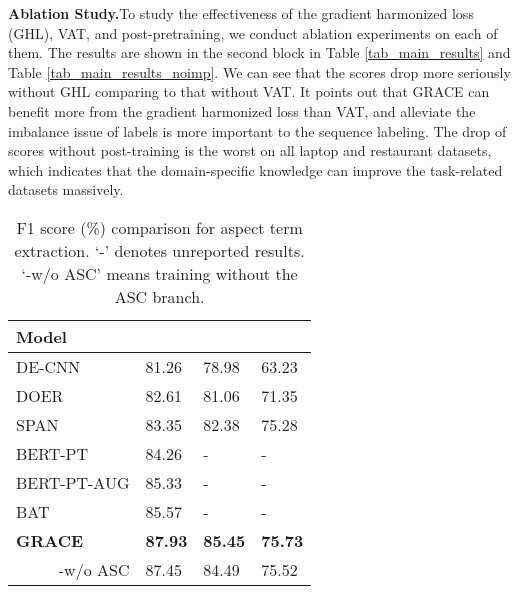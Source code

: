 \documentclass[11pt,a4paper]{article}
\begin{document}
\vspace{+1mm}
\noindent
\textbf{Ablation Study.}\quad To study the effectiveness of the gradient harmonized loss (GHL), VAT, and post-pretraining, we conduct ablation experiments on each of them. The results are shown in the second block in Table \ref{tab_main_results} and Table \ref{tab_main_results_noimp}. We can see that the scores drop more seriously without GHL comparing to that without VAT. It points out that GRACE can benefit more from the gradient harmonized loss than VAT, and alleviate the imbalance issue of labels is more important to the sequence labeling. The drop of scores without post-training is the worst on all laptop and restaurant datasets, which indicates that the domain-specific knowledge can improve the task-related datasets massively.
\begin{table}[tp]
    \begin{center}
        \begin{tabular}{|l|p{1.1cm}<{\centering}|p{1.1cm}<{\centering}|p{1.1cm}<{\centering}|}
            \hline
            Model     &  &  &  \\ \hline \hline
            DE-CNN             & 81.26 & 78.98 & 63.23  \\ 
            DOER               & 82.61 & 81.06 & 71.35 \\ 
            SPAN     & 83.35 & 82.38 & 75.28 \\ 
            BERT-PT            & 84.26 & - & - \\ 
            BERT-PT-AUG        & 85.33 & - & - \\ 
            BAT                & 85.57 & - & - \\ 
            \hline
            \textbf{GRACE}      & \textbf{87.93} & \textbf{85.45} & \textbf{75.73} \\ 
            \multicolumn{1}{|r|}{-w/o ASC} & 87.45 & 84.49 & 75.52 \\ 
            \hline
            \end{tabular}
    \end{center}
    \caption{\label{table_results_ate} F1 score (\%) comparison for aspect term extraction. `-' denotes unreported results. `-w/o ASC' means training without the ASC branch.}
\end{table}
\end{document}
